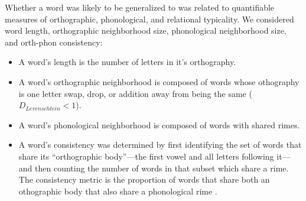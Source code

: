\documentclass[10pt,letterpaper]{article}
\begin{document}
Whether a word was likely to be generalized to was related to quantifiable measures of orthographic, phonological, and relational typicality.
We considered word length, orthographic neighborhood size, phonological neighborhood size, and orth-phon consistency:
\begin{itemize}
	\item A word's length is the number of letters in it's orthography.
	\item A word's orthographic neighborhood is composed of words whose othography is one letter swap, drop, or addition away from being the same ($D_{Levenschtein} < 1$).
	\item A word's phonological neighborhood is composed of words with shared rimes.
	\item A word's consistency was determined by first identifying the set of words that share its ``orthographic body''---the first vowel and all letters following it---and then counting the number of words in that subset which share a rime.
	The consistency metric is the proportion of words that share both an othographic body that also share a phonological rime \cite{Plaut1996}.
\end{itemize}

\end{document}
